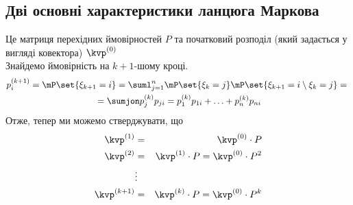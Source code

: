 \subsection{Дві основні характеристики ланцюга Маркова}
Це матриця перехідних ймовірностей $P$ та початковий розподіл (який задається у вигляді ковектора) $\kvp^{(0)}$\\
Знайдемо ймовірність на $k+1$-шому кроці.
\begin{multline}
p_i^{(k+1)} = \mP\set{\xi_{k+1} = i} = \suml_{j=1}^n\mP\set{\xi_k = j}\mP\set{\xi_{k+1} = i \setminus  \xi_k=j} ={} \\ {} = \sumjon p_j^{(k)} p_{ji} = p_1^{(k)} p_{1i}+\ldots+p_n^{(k)}p_{ni}
\end{multline}
Отже, тепер ми можемо стверджувати, що 
\begin{eqnarray}
\kvp^{(1)} &=& \kvp^{(0)} \cdot P\\
\kvp^{(2)} &=& \kvp^{(1)} \cdot P = \kvp^{(0)}\cdot P^2\\
&\vdots&\nonumber\\
\kvp^{(k+1)} &=& \kvp^{(k)} \cdot P =\kvp^{(0)}\cdot P^k
\end{eqnarray}
